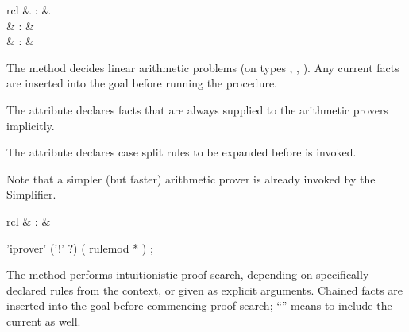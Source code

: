 \begin{isabellebody}
\begin{isamarkuptext}
\end{isamarkuptext}%
\isamarkuptrue%
%
\isamarkuptrue%
%
\begin{isamarkuptext}%
\begin{matharray}{rcl}
    \hypertarget{method.HOL.arith}{\hyperlink{method.HOL.arith}{\mbox{}}} & : &  \\
    \hypertarget{attribute.HOL.arith}{\hyperlink{attribute.HOL.arith}{\mbox{}}} & : &  \\
    \hypertarget{attribute.HOL.arith-split}{\hyperlink{attribute.HOL.arith-split}{\mbox{}}} & : &  \\
  \end{matharray}

  The \hyperlink{method.HOL.arith}{\mbox{}} method decides linear arithmetic problems
  (on types , , ).  Any current
  facts are inserted into the goal before running the procedure.

  The \hyperlink{attribute.HOL.arith}{\mbox{}} attribute declares facts that are
  always supplied to the arithmetic provers implicitly.

  The \hyperlink{attribute.HOL.arith-split}{\mbox{}} attribute declares case split
  rules to be expanded before \hyperlink{method.HOL.arith}{\mbox{}} is invoked.

  Note that a simpler (but faster) arithmetic prover is
  already invoked by the Simplifier.%
\end{isamarkuptext}%
\isamarkuptrue%
%
\isamarkuptrue%
%
\begin{isamarkuptext}%
\begin{matharray}{rcl}
    \hypertarget{method.HOL.iprover}{\hyperlink{method.HOL.iprover}{\mbox{}}} & : &  \\
  \end{matharray}

  \begin{rail}
    'iprover' ('!' ?) ( rulemod * )
    ;
  \end{rail}

  The \hyperlink{method.HOL.iprover}{\mbox{}} method performs intuitionistic proof
  search, depending on specifically declared rules from the context,
  or given as explicit arguments.  Chained facts are inserted into the
  goal before commencing proof search; ``\hyperlink{method.HOL.iprover}{\mbox{}}\isa{{\isachardoublequote}{\isacharbang}{\isachardoublequote}}''  means to include the current \hyperlink{fact.prems}{\mbox{}} as well.
  

\end{isamarkuptext}
\end{isabellebody}
